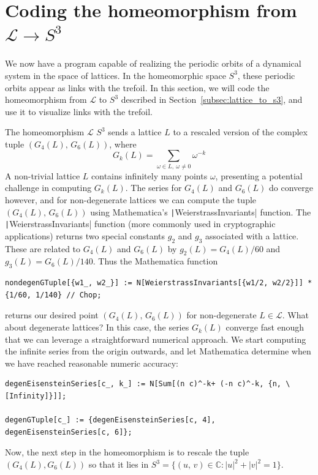 \documentclass[12pt,twoside]{reedthesis}
\theoremstyle{definition}
\newcommand{\C}{\mathbb{C}}
\newcommand{\LS}{\mathcal{L}}
\begin{document}
\section{Coding the homeomorphism from $\LS \to S^3$}

We now have a program capable of realizing the periodic orbits of a dynamical system in the space of lattices.
In the homeomorphic space $S^3$, these periodic orbits appear as links with the trefoil.
In this section, we will code the homeomorphism from $\LS$ to $S^3$ described in Section~\ref{subsec:lattice_to_s3}, and use it to visualize links with the trefoil.

The homeomorphism $\LS$ $S^3$ sends a lattice $L$ to a rescaled version of the complex tuple $(G_4(L),\, G_6(L))$, where
\begin{equation*}
  G_k(L) = \sum_{\omega \in L,\ \omega \neq 0} \omega^{-k}
\end{equation*}
A non-trivial lattice $L$ contains infinitely many points $\omega$, presenting a potential challenge in computing $G_k(L)$.
The series for $G_4(L)$ and $G_6(L)$ do converge however, and for non-degenerate lattices we can compute the tuple $(G_4(L),\, G_6(L))$ using Mathematica's \texttt|WeierstrassInvariants| function.
The \texttt|WeierstrassInvariants| function (more commonly used in cryptographic applications) returns two special constants $g_2$ and $g_3$ associated with a lattice.
These are related to $G_4(L)$ and $G_6(L)$ by $g_2(L) = G_4(L) / 60$ and $g_3(L) = G_6(L) / 140$.
Thus the Mathematica function
\begin{verbatim}
nondegenGTuple[{w1_, w2_}] := N[WeierstrassInvariants[{w1/2, w2/2}]] * {1/60, 1/140} // Chop;
\end{verbatim}
returns our desired point $(G_4(L),\, G_6(L))$ for non-degenerate $L \in \LS$.
What about degenerate lattices?
In this case, the series $G_k(L)$ converge fast enough that we can leverage a straightforward numerical approach.
We start computing the infinite series from the origin outwards, and let Mathematica determine when we have reached reasonable numeric accuracy:
\begin{verbatim}
degenEisensteinSeries[c_, k_] := N[Sum[(n c)^-k+ (-n c)^-k, {n, \[Infinity]}]];

degenGTuple[c_] := {degenEisensteinSeries[c, 4], degenEisensteinSeries[c, 6]};
\end{verbatim}
Now, the next step in the homeomorphism is to rescale the tuple $(G_4(L), G_6(L))$ so that it lies in $S^3 = \{(u,\, v) \in \C : |u|^2 + |v|^2 = 1\}$.
\end{document}
